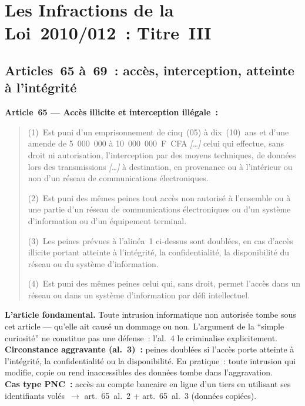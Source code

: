 \section{Les Infractions de la Loi~2010/012~: Titre~III}
\label{sec:infractions-loi2010}

\subsection{Articles~65 à~69~: accès, interception, atteinte à l'intégrité}

\begin{boxjuris}
\textbf{Article~65 --- Accès illicite et interception illégale~:}
\begin{quote}
(1)~Est puni d'un emprisonnement de cinq~(05) à dix~(10)~ans et d'une
amende de 5~000~000 à 10~000~000~F~CFA \textit{[\ldots]} celui qui effectue,
sans droit ni autorisation, l'interception par des moyens techniques, de
données lors des transmissions \textit{[\ldots]} à destination, en provenance
ou à l'intérieur ou non d'un réseau de communications électroniques.

(2)~Est puni des mêmes peines tout accès non autorisé à l'ensemble ou à
une partie d'un réseau de communications électroniques ou d'un système
d'information ou d'un équipement terminal.

(3)~Les peines prévues à l'alinéa~1 ci-dessus sont doublées, en cas
d'accès illicite portant atteinte à l'intégrité, la confidentialité,
la disponibilité du réseau ou du système d'information.

(4)~Est puni des mêmes peines celui qui, sans droit, permet l'accès dans
un réseau ou dans un système d'information par défi intellectuel.
\end{quote}
\textbf{L'article fondamental.} Toute intrusion informatique non autorisée
tombe sous cet article --- qu'elle ait causé un dommage ou non. L'argument
de la ``simple curiosité'' ne constitue pas une défense~: l'al.~4 le
criminalise explicitement.\\[0.3ex]
\textbf{Circonstance aggravante (al.~3)~:} peines doublées si l'accès porte
atteinte à l'intégrité, la confidentialité ou la disponibilité.
En pratique~: toute intrusion qui modifie, copie ou rend inaccessibles
des données tombe dans l'aggravation.\\[0.3ex]
\textbf{Cas type PNC~:} accès au compte bancaire en ligne d'un tiers en
utilisant ses identifiants volés~$\to$ art.~65~al.~2 + art.~65~al.~3
(données copiées).
\end{boxjuris}

